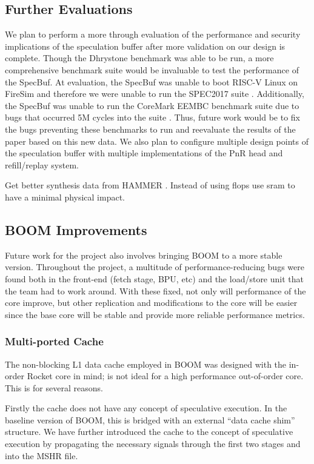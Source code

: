 \subsection{Further Evaluations}

We plan to perform a more through evaluation of the performance and security implications of the
speculation buffer after more validation on our design is complete. 
Though the Dhrystone benchmark was able to be run, a more comprehensive benchmark suite would be invaluable to test
the performance of the SpecBuf. At evaluation, the SpecBuf was unable to boot RISC-V Linux on FireSim and therefore
we were unable to run the SPEC2017 suite \cite{b50}. Additionally, the SpecBuf was unable to run the CoreMark EEMBC benchmark
suite due to bugs that occurred 5M cycles into the suite \cite{b51}. Thus, future work would be to fix the bugs preventing these
benchmarks to run and reevaluate the results of the paper based on this new data. We also plan to configure multiple design
points of the speculation buffer with multiple implementations of the PnR head and refill/replay system.

Get better synthesis data from HAMMER \cite{b52}. Instead of using flops use sram to have a minimal 
physical impact.

\subsection{BOOM Improvements}

Future work for the project also involves bringing BOOM to a more stable version. Throughout
the project, a multitude of performance-reducing bugs were found both in the front-end (fetch stage, BPU, etc) and the 
load/store unit that the team had to work around. With these fixed, not only will performance
of the core improve, but other replication and modifications to the core will be easier since
the base core will be stable and provide more reliable performance metrics.

\subsubsection{Multi-ported Cache}
The non-blocking L1 data cache employed in BOOM was designed with the in-order Rocket core in mind; is not ideal for
a high performance out-of-order core. This is for several reasons.

Firstly the cache does not have any concept of speculative execution.
In the baseline version of BOOM, this is bridged with an external ``data cache shim'' structure. We have further introduced the cache to the
concept of speculative execution by propagating the necessary signals through the first two stages and into the MSHR file.

